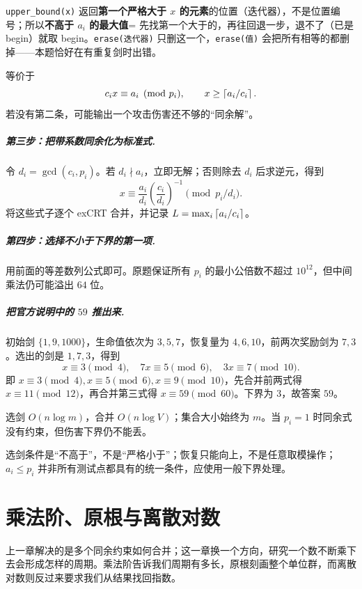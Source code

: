 \begin{tip}[两个容器术语]
\texttt{upper\_bound(x)} 返回\textbf{第一个严格大于 $x$ 的元素}的位置（迭代器），不是位置编号；所以\textbf{不高于 $a_i$ 的最大值}= 先找第一个大于的，再往回退一步，退不了（已是 begin）就取 begin。\texttt{erase(迭代器)} 只删这一个，\texttt{erase(值)} 会把所有相等的都删掉——本题恰好在有重复剑时出错。
\end{tip}

等价于
\[
 c_ix\equiv a_i\pmod{p_i},\qquad x\ge\left\lceil a_i/c_i\right\rceil.
\]
若没有第二条，可能输出一个攻击伤害还不够的“同余解”。

\paragraph{第三步：把带系数同余化为标准式.}
令 $d_i=\gcd(c_i,p_i)$。若 $d_i\nmid a_i$，立即无解；否则除去 $d_i$ 后求逆元，得到
\[
 x\equiv \frac{a_i}{d_i}\left(\frac{c_i}{d_i}\right)^{-1}
 \pmod{p_i/d_i}.
\]
将这些式子逐个 exCRT 合并，并记录 $L=\max_i\left\lceil a_i/c_i\right\rceil$。
\paragraph{第四步：选择不小于下界的第一项.}
用前面的等差数列公式即可。原题保证所有 $p_i$ 的最小公倍数不超过 $10^{12}$，但中间乘法仍可能溢出 $64$ 位。

\paragraph{把官方说明中的 $59$ 推出来.}
初始剑 $\{1,9,1000\}$，生命值依次为 $3,5,7$，恢复量为 $4,6,10$，前两次奖励剑为 $7,3$。选出的剑是 $1,7,3$，得到
\[
 x\equiv3\pmod4,\quad7x\equiv5\pmod6,\quad3x\equiv7\pmod{10}.
\]
即 $x\equiv3\pmod4,x\equiv5\pmod6,x\equiv9\pmod{10}$，先合并前两式得 $x\equiv11\pmod{12}$，再合并第三式得 $x\equiv59\pmod{60}$。下界为 $3$，故答案 $59$。

\cost 选剑 $O(n\log m)$，合并 $O(n\log V)$；集合大小始终为 $m$。当 $p_i=1$ 时同余式没有约束，但伤害下界仍不能丢。
\begin{teach}[学生容易漏掉的三件事]
选剑条件是“不高于”，不是“严格小于”；恢复只能向上，不是任意取模操作；$a_i\le p_i$ 并非所有测试点都具有的统一条件，应使用一般下界处理。
\end{teach}



\chapter{乘法阶、原根与离散对数}
\begin{chapterintro}[章节导读]
上一章解决的是多个同余约束如何合并；这一章换一个方向，研究一个数不断乘下去会形成怎样的周期。乘法阶告诉我们周期有多长，原根刻画整个单位群，而离散对数则反过来要求我们从结果找回指数。
\end{chapterintro}

